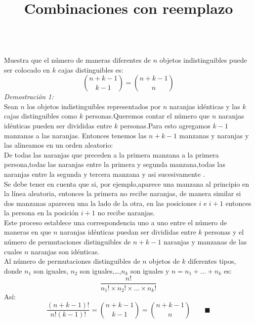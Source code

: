 \documentclass[a4,papper]{article}
\title{\bf Combinaciones con reemplazo}
\date{}
\begin{document}
\maketitle
\ \\[-1.5cm]
\noindent Muestra que el número de maneras diferentes de $n$ objetos indistinguibles puede ser colocado en $k$ cajas distinguibles es:\\
$$
\binom{n+k-1}{k-1}=\binom{n+k-1}{n}
$$
\emph{Demostración 1:}\\
Sean $n$ los objetos indistinguibles representados por $n$ naranjas idénticas y las  $k$ cajas distinguibles como $k$ personas.Queremos contar el número que $n$ naranjas idénticas pueden ser divididas entre $k$ personas.Para esto agregamos $k-1$ manzanas a las naranjas.
Entonces tenemos  las $n+k-1$ manzanas y naranjas y las alineamos en un orden aleatorio:\\
De todas las naranjas que preceden a la primera manzana a la primera persona,todas las naranjas entre la primera y segunda manzana,todas las naranjas entre la segunda y tercera manzana y  asi sucesivamente .\\
Se debe tener en cuenta que si, por ejemplo,aparece una manzana al principio en la línea aleatoria, entonces la primera no recibe naranjas, de manera similar si dos manzanas aparecen una la lado de la otra, en las posiciones $i$ e $i+1$ entonces la persona en la posición $i+1$ no recibe naranjas.\\
Este proceso establece una correspondencia uno a uno entre el número de maneras en que $n$ naranjas idénticas puedan ser divididas entre $k$ personas y el número de permutaciones distinguibles de $n+k-1$ naranjas y manzanas de las cuales $n$ naranjas son idénticas.\\
\teo Al número de permutaciones distinguibles de $n$ objetos de $k$ diferentes tipos, donde $n_1$ son iguales, $n_2$ son iguales,\ldots,$n_k$ son iguales y $n=n_1+\ldots+n_k$ es:\\
$$
\frac{n!}{n_1!\times n_2! \times \ldots \times n_k!}
$$
Así:\\
$$
\frac{(n+k-1)!}{n!(k-1)!}=\binom{n+k-1}{k-1}=\binom{n+k-1}{n} \qquad\blacksquare
$$
\end{document}
